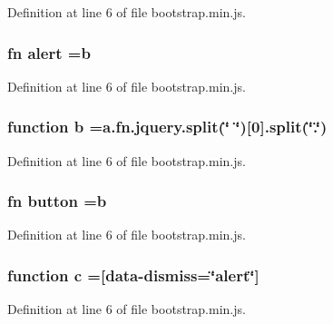 Definition at line 6 of file bootstrap.\+min.\+js.

\subsubsection[{alert}]{ {\bf fn} alert ={\bf b}}\label{bootstrap_8min_8js_aaa41eef066735d697e7786ec86d52389}


Definition at line 6 of file bootstrap.\+min.\+js.

\subsubsection[{b}]{\setlength{\rightskip}{0pt plus 5cm}function {\bf b} =a.\+fn.\+jquery.\+split(\char`\"{} \char`\"{})[0].split(\char`\"{}.\char`\"{})}\label{bootstrap_8min_8js_ac0431efac4d7c393d1e70b86115cb93f}


Definition at line 6 of file bootstrap.\+min.\+js.

\subsubsection[{button}]{ {\bf fn} button ={\bf b}}\label{bootstrap_8min_8js_a55e170814e74f6c3db8ae9ea3ba9054f}


Definition at line 6 of file bootstrap.\+min.\+js.

\subsubsection[{c}]{\setlength{\rightskip}{0pt plus 5cm}function {\bf c} =\textquotesingle{}[{\bf data}-\/dismiss=\char`\"{}alert\char`\"{}]\textquotesingle{}}\label{bootstrap_8min_8js_ad9d1ac02e33c4aed62ad517a7cb8b3fb}


Definition at line 6 of file bootstrap.\+min.\+js.

